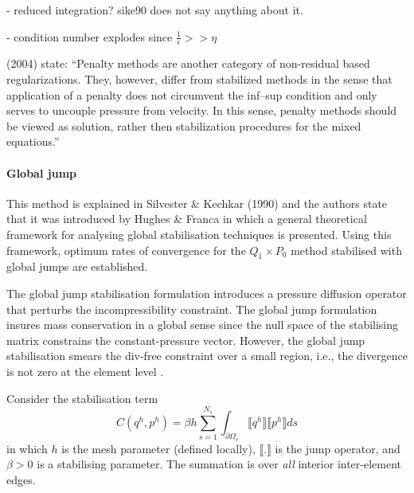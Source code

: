 - reduced integration? sike90 does not say anything about it.

- condition number explodes since $\frac{1}{\epsilon} >> \eta$

\textcite{dobo04} (2004) state: ``Penalty methods are another category of non-residual based regularizations.
They, however, differ from stabilized methods in the sense that application of a penalty does not circumvent the inf–sup condition and only serves to uncouple pressure from velocity. In
this sense, penalty methods should be viewed as solution, rather then stabilization procedures for the mixed equations.''

\vspace{.5cm}

\paragraph{Global jump}

This method is explained in Silvester \& Kechkar (1990) and the authors state that it was introduced by Hughes \& Franca \cite{hufr87} in which a general theoretical framework for analysing global stabilisation techniques is presented. Using this framework, optimum rates of convergence for the $Q_1\times P_0$ method stabilised with global jumps are established.

The global jump stabilisation formulation introduces a pressure diffusion operator that perturbs the incompressibility constraint. The global jump formulation insures mass conservation in a global sense since the null space of the stabilising matrix constrains the constant-pressure vector.
However, the global jump stabilisation smears the div-free constraint over a small region, i.e., the divergence is not zero at the element level \cite{chri00}.

Consider the stabilisation term
\begin{equation}
C(q^h,p^h) 
=\beta h \sum_{s=1}^{N_s} 
\int_{\partial \Omega_s} \llbracket q^h \rrbracket  \llbracket p^h \rrbracket ds 
\end{equation}
in which $h$ is the mesh parameter (defined locally), $\llbracket . \rrbracket$ is the jump operator, and $\beta>0$ is a stabilising parameter. The summation is over {\it all} interior inter-element edges.

